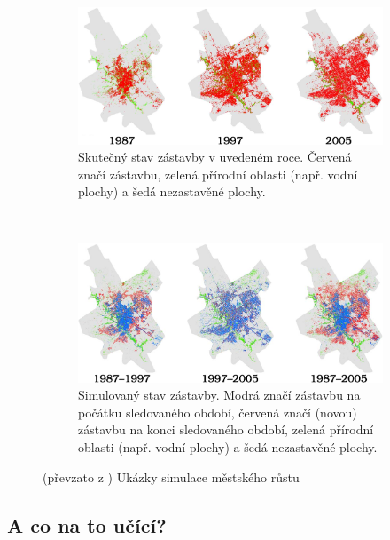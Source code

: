 \documentclass[a4paper,10pt]{article}
\begin{document}
\begin{figure}[]
    \begin{subfigure}[t]{\textwidth} \centering
      \includegraphics[width=\textwidth]{urban-growt-city-1}
      \caption{Skutečný stav zástavby v uvedeném roce. Červená značí zástavbu, zelená přírodní oblasti (např. vodní plochy) a šedá nezastavěné plochy.} 
    \end{subfigure}
    \\
    \begin{subfigure}[t]{\textwidth} \centering
      \includegraphics[width=\textwidth]{urban-growt-city-2}
      \caption{Simulovaný stav zástavby. Modrá značí zástavbu na počátku sledovaného období, červená značí (novou) zástavbu na konci sledovaného období, zelená přírodní oblasti (např. vodní plochy) a šedá nezastavěné plochy.} 
    \end{subfigure}

    \caption[Ukázky simulace městského růstu]{(převzato z \cite{Ahm+-CalFuzCelAutModUrbDynSauAr}) Ukázky simulace městského růstu} \label{img-UrbGroProSample}
\end{figure}


\subsection{A co na to učící?}
\end{document}
